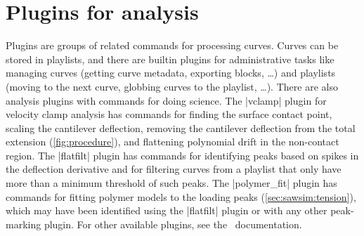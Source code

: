 \section{Plugins for analysis}
\label{sec:hooke:plugins}

Plugins are groups of related commands for processing curves.  Curves
can be stored in playlists, and there are builtin plugins for
administrative tasks like managing curves (getting curve metadata,
exporting blocks, \ldots) and playlists (moving to the next curve,
globbing curves to the playlist, \ldots).  There are also analysis
plugins with commands for doing science.  The |vclamp|
plugin for velocity clamp analysis has commands for finding the
surface contact point, scaling the cantilever deflection, removing the
cantilever deflection from the total extension (\cref{fig:procedure}),
and flattening polynomial drift in the non-contact region.  The
|flatfilt| plugin has commands for identifying peaks
based on spikes in the deflection derivative and for filtering curves
from a playlist that only have more than a minimum threshold of such
peaks\citep{sandal08}.  The |polymer_fit| plugin has
commands for fitting polymer models to the loading peaks
(\cref{sec:sawsim:tension}), which may have been identified using the
|flatfilt| plugin or with any other peak-marking plugin.
For other available plugins, see the \Hooke\ documentation.
%
